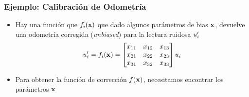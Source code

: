 \begin{frame}
    \frametitle{Ejemplo: Calibración de Odometría}
    
    \begin{itemize}
        \item Hay una función que $f_{i}(\boldsymbol{\mathbf{x}})$ que dado algunos parámetros de bias $\boldsymbol{\mathbf{x}}$, devuelve una odometría corregida (\emph{unbiased}) para la lectura ruidosa $u_{i}^{\prime}$ 
        \begin{equation*}
            u_{i}^{\prime} = f_{i}(\boldsymbol{\mathbf{x}}) =
            \begin{bmatrix}
                x_{11} & x_{12} & x_{13} \\
                x_{21} & x_{22} & x_{23} \\
                x_{31} & x_{32} & x_{33}
            \end{bmatrix}
            u_{i}
        \end{equation*}
    \item Para obtener la función de corrección $f(\boldsymbol{\mathbf{x}})$, necesitamos encontrar los parámetros $\boldsymbol{\mathbf{x}}$
    \end{itemize}
    
\end{frame}


